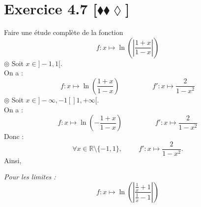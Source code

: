 \documentclass[10pt]{article}
\begin{document}
\section*{Exercice 4.7 [$\blacklozenge\blacklozenge\lozenge$]}
\begin{tcolorbox}[enhanced, width=7in, center, size=fbox, fontupper=\large, drop shadow southwest]
    Faire une étude complète de la fonction 
    \begin{equation*}
        f:x\mapsto\ln\left(\left|\frac{1+x}{1-x}\right|\right)
    \end{equation*}
    $\circledcirc$ Soit $x\in]-1,1[$.\\
    On a :
    \begin{equation*}
        f:x\mapsto\ln\left(\frac{1+x}{1-x}\right) \hspace{2cm} f':x\mapsto\frac{2}{1-x^2}
    \end{equation*}
    $\circledcirc$ Soit $x\in]-\infty,-1[]1,+\infty[$.\\
    On a :
    \begin{equation*}
        f:x\mapsto\ln\left(-\frac{1+x}{1-x}\right) \hspace{2cm} f':x\mapsto\frac{2}{1-x^2}
    \end{equation*}
    Donc :
    \begin{equation*}
        \forall{x\in\mathbb{R}\setminus\{-1,1\}}, \hspace{1cm} f':x\mapsto\frac{2}{1-x^2}.
    \end{equation*}
    Ainsi,
    \begin{center}
    \end{center}
    \emph{Pour les limites :}
    \begin{equation*}
        f:x\mapsto\ln\left(\left|\frac{\frac{1}{x}+1}{\frac{1}{x}-1}\right|\right)
    \end{equation*}
\end{tcolorbox}
\end{document}
